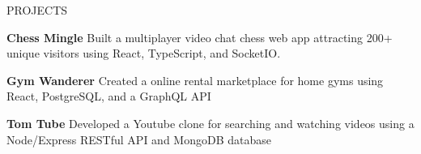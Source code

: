 \documentclass{resume} %
\begin{document}

\begin{rSection}{PROJECTS}
\vspace{-1.25em}

\item \textbf{Chess Mingle} {Built a multiplayer video chat chess web app attracting 200+ unique visitors using React, TypeScript, and SocketIO.}


\item \textbf{Gym Wanderer} {Created a online rental marketplace for home gyms using React, PostgreSQL, and a GraphQL API}

\item \textbf{Tom Tube} {Developed a Youtube clone for searching and watching videos using a Node/Express RESTful API and MongoDB database}



\end{rSection} 






\end{document}
